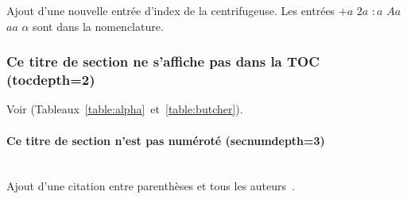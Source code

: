 		Ajout d'une nouvelle entrée d'index de la centrifugeuse. Les entrées $+a$ $2a$ $:a$ $Aa$ $aa$ $\alpha$ {\NoAutoSpaceBeforeFDP}sont dans la nomenclature.

		\subsubsection{Ce titre de section ne s'affiche pas dans la TOC (tocdepth=2)}

		Voir (Tableaux~\ref{table:alpha}~et~\ref{table:butcher}).

			\paragraph{Ce titre de section n'est pas numéroté (secnumdepth=3)}~~\\ %

			Ajout d'une citation entre parenthèses et tous les auteurs~\parencite{zohdy_mapping_2012}.
